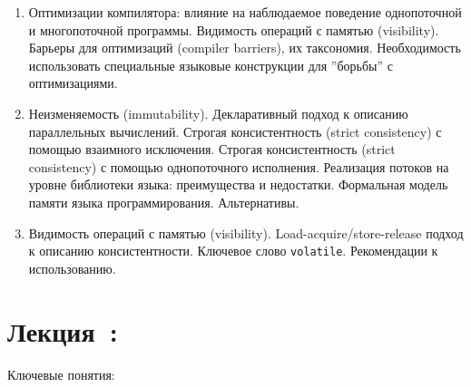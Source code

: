\documentclass[a4paper, 12pt]{extarticle}
\begin{document}
\begin{enumerate}[\thesection .1]
	\item Оптимизации компилятора: влияние на наблюдаемое поведение однопоточной и многопоточной программы. Видимость операций с памятью (visibility).
	Барьеры для оптимизаций (compiler barriers), их таксономия. Необходимость использовать специальные языковые конструкции для ''борьбы'' с оптимизациями.
	
	\item \langMM 

	Неизменяемость (immutability). Декларативный подход к описанию параллельных вычислений.
	Строгая консистентность (strict consistency) с помощью взаимного исключения.
	Строгая консистентность (strict consistency) с помощью однопоточного исполнения.
	Реализация потоков на уровне библиотеки языка: преимущества и недостатки.
	Формальная модель памяти языка программирования. Альтернативы.
	
	\item \langMM 
	
	Видимость операций с памятью (visibility). Load-acquire/store-release подход к описанию консистентности. Ключевое слово \texttt{volatile}. Рекомендации к использованию.

\end{enumerate}

\section{Лекция~\advancedConcurrencyNum: \advancedConcurrencyTopic}

Ключевые понятия: \advancedConcurrencyKey
\end{document}
